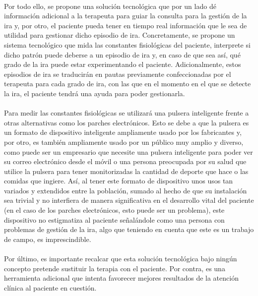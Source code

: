 \paragraph{}
Por todo ello, se propone una solución tecnológica que por un lado dé información adicional a la terapeuta para guiar la consulta para la gestión de la ira y, por otro, el paciente pueda tener en tiempo real información que le sea de utilidad para gestionar dicho episodio de ira. Concretamente, se propone un sistema tecnológico que mida las constantes fisiológicas del paciente, interprete si dicho patrón puede deberse a un episodio de ira y, en caso de que sea así, qué grado de la ira puede estar experimentando el paciente. Adicionalmente, estos episodios de ira se traducirán en pautas previamente confeccionadas por el terapeuta para cada grado de ira, con las que en el momento en el que se detecte la ira, el paciente tendrá una ayuda para poder gestionarla.

\paragraph{}
Para medir las constantes fisiológicas se utilizará una pulsera inteligente frente a otras alternativas como los parches electrónicos. Esto se debe a que la pulsera es un formato de dispositivo inteligente ampliamente usado por los fabricantes y, por otro, es también ampliamente usado por un público muy amplio y diverso, como puede ser un empresario que necesite una pulsera inteligente para poder ver su correo electrónico desde el móvil o una persona preocupada por su salud que utilice la pulsera para tener monitorizadas la cantidad de deporte que hace o las comidas que ingiere. Así, al tener este formato de dispositivo unos usos tan variados y extendidos entre la población, sumado al hecho de que su instalación sea trivial y no interfiera de manera significativa en el desarrollo vital del paciente (en el caso de los parches electrónicos, esto puede ser un problema), este dispositivo no estigmatiza al paciente señalándole como una persona con problemas de gestión de la ira, algo que teniendo en cuenta que este es un trabajo de campo, es imprescindible.

\paragraph{}
Por último, es importante recalcar que esta solución tecnológica bajo ningún concepto pretende sustituir la terapia con el paciente. Por contra, es una herramienta adicional que intenta favorecer mejores resultados de la atención clínica al paciente en cuestión.


